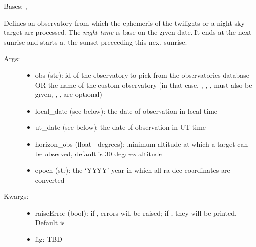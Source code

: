 \documentclass[letterpaper,10pt,english]{sphinxmanual}
\begin{document}
\begin{fulllineitems}
\label{astroobs:astroobs.Observatory.Observatory}
Bases: , 

Defines an observatory from which the ephemeris of the twilights or a night-sky target are processed. The \emph{night-time} is base on the given date. It ends at the next sunrise and starts at the sunset preceeding this next sunrise.
\begin{description}
\item[{Args:}] \leavevmode\begin{itemize}
\item {} 
obs (str): id of the observatory to pick from the observatories database OR the name of the custom observatory (in that case, , , ,  must also be given, , ,  are optional)

\item {} 
local\_date (see below): the date of observation in local time

\item {} 
ut\_date (see below): the date of observation in UT time

\item {} 
horizon\_obs (float - degrees): minimum altitude at which a target can be observed, default is 30 degrees altitude

\item {} 
epoch (str): the `YYYY' year in which all ra-dec coordinates are converted

\end{itemize}

\item[{Kwargs:}] \leavevmode\begin{itemize}
\item {} 
raiseError (bool): if , errors will be raised; if , they will be printed. Default is 

\item {} 
fig: TBD

\end{itemize}


\end{description}
\end{fulllineitems}
\end{document}
